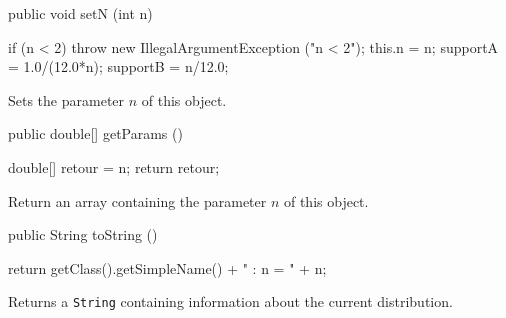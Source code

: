 \begin{code}

   public void setN (int n)\begin{hide} {
      if (n < 2)
         throw new IllegalArgumentException ("n < 2");
      this.n = n;
      supportA = 1.0/(12.0*n);
      supportB = n/12.0;
   }\end{hide}
\end{code}
 \begin{tabb} Sets the parameter $n$ of this object.
 \end{tabb}
 \begin{code}

   public double[] getParams ()\begin{hide} {
      double[] retour = {n};
      return retour;
   }\end{hide}
\end{code}
\begin{tabb}
   Return an array containing the parameter $n$ of this object.
\end{tabb}
\begin{hide}\begin{code}

   public String toString ()\begin{hide} {
      return getClass().getSimpleName() + " : n = " + n;
   }\end{hide}
\end{code}
\begin{tabb}
   Returns a \texttt{String} containing information about the current distribution.
\end{tabb}\end{hide}
\begin{code}\begin{hide}
}\end{hide}
\end{code}
